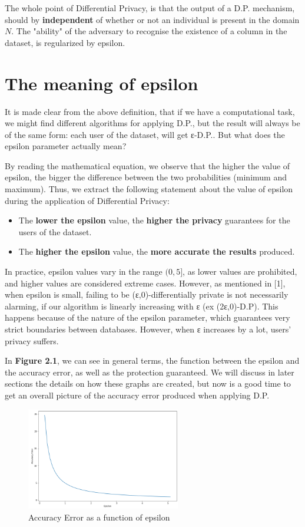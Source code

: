 The whole point of Differential Privacy, is that the output of a D.P. mechanism, should by \textbf{independent} of whether or not an individual is present in the domain $N$. The "ability" of the adversary to recognise the existence of a column in the dataset, is regularized by epsilon.

\section{The meaning of epsilon}
It is made clear from the above definition, that if we have a computational task, we might find different algorithms for applying D.P., but the result will always be of the same form: each user of the dataset, will get ε-D.P.. But what does the epsilon parameter actually mean?

By reading the mathematical equation, we observe that the higher the value of epsilon, the bigger the difference between the two probabilities (minimum and maximum). Thus, we extract the following statement about the value of epsilon during the application of Differential Privacy:

\begin{itemize}
    \item The \textbf{lower the epsilon} value, the \textbf{higher the privacy} guarantees for the users of the dataset.
    \item The \textbf{higher the epsilon} value, the \textbf{more accurate the results} produced.
\end{itemize}

In practice, epsilon values vary in the range $(0,5]$, as lower values are prohibited, and higher values are considered extreme cases. However, as mentioned in [1],  when epsilon is small, failing to be (ε,0)-differentially private is not necessarily alarming, if our algorithm is linearly increasing with ε (ex (2ε,0)-D.P). This happens because of the nature of the epsilon parameter, which guarantees very strict boundaries between databases. However, when ε increases by a lot, users' privacy suffers. 

In \textbf{Figure 2.1}, we can see in general terms, the function between the epsilon and the accuracy error, as well as the protection guaranteed. We will discuss in later sections the details on how these graphs are created, but now is a good time to get an overall picture of the accuracy error produced when applying D.P.
\bigskip
\bigskip\bigskip

\begin{figure}[!htb]\centering
      \includegraphics[width=0.6\textwidth]{images/epsilon_intro_graph.png}
  \caption{Accuracy Error as a function of epsilon}
\end{figure}

